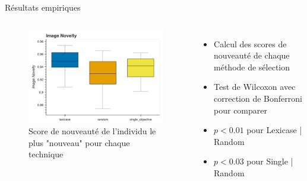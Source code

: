 \documentclass[aspectratio=169]{beamer}
\begin{document}
\begin{frame}{Résultats empiriques}
    \begin{columns}
            \begin{figure}
            \centering
            \includegraphics[scale=0.4]{fig/novelty.png}
            \caption{Score de nouveauté de l'individu le plus "nouveau" pour chaque technique}
            \end{figure}
        \begin{itemize}
            \item Calcul des scores de nouveauté de chaque méthode de sélection
            \item Test de Wilcoxon avec correction de Bonferroni pour comparer 
            \item $p < 0.01$ pour Lexicase | Random 
            \item $p < 0.03$ pour Single | Random
        \end{itemize}
    \end{columns}
\end{frame}
\end{document}

